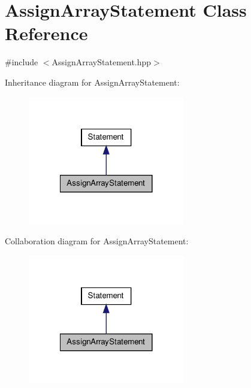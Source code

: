 \hypertarget{class_assign_array_statement}{\section{Assign\-Array\-Statement Class Reference}
\label{class_assign_array_statement}
}


{\ttfamily \#include $<$Assign\-Array\-Statement.\-hpp$>$}



Inheritance diagram for Assign\-Array\-Statement\-:
\nopagebreak
\begin{figure}[H]
\begin{center}
\leavevmode
\includegraphics[width=194pt]{class_assign_array_statement__inherit__graph}
\end{center}
\end{figure}


Collaboration diagram for Assign\-Array\-Statement\-:
\nopagebreak
\begin{figure}[H]
\begin{center}
\leavevmode
\includegraphics[width=194pt]{class_assign_array_statement__coll__graph}
\end{center}
\end{figure}
